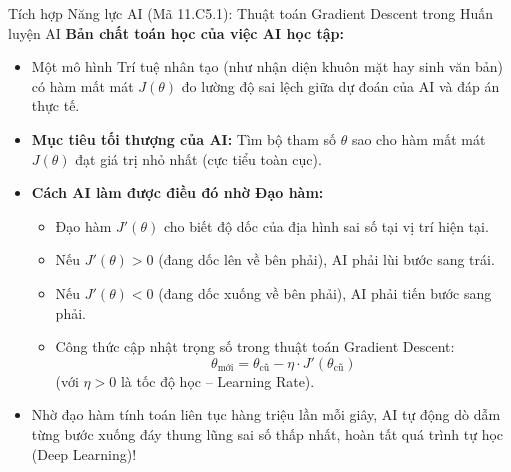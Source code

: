 \documentclass[12pt, a4paper]{article}
\begin{document}
\begin{aibox}{Tích hợp Năng lực AI (Mã 11.C5.1): Thuật toán Gradient Descent trong Huấn luyện AI}
\textbf{Bản chất toán học của việc AI học tập:}
\begin{itemize}[leftmargin=0.5cm]
    \item Một mô hình Trí tuệ nhân tạo (như nhận diện khuôn mặt hay sinh văn bản) có hàm mất mát $J(\theta)$ đo lường độ sai lệch giữa dự đoán của AI và đáp án thực tế.
    \item \textbf{Mục tiêu tối thượng của AI:} Tìm bộ tham số $\theta$ sao cho hàm mất mát $J(\theta)$ đạt giá trị nhỏ nhất (cực tiểu toàn cục).
    \item \textbf{Cách AI làm được điều đó nhờ Đạo hàm:}
    \begin{itemize}[leftmargin=0.4cm]
        \item Đạo hàm $J'(\theta)$ cho biết độ dốc của địa hình sai số tại vị trí hiện tại.
        \item Nếu $J'(\theta) > 0$ (đang dốc lên về bên phải), AI phải lùi bước sang trái.
        \item Nếu $J'(\theta) < 0$ (đang dốc xuống về bên phải), AI phải tiến bước sang phải.
        \item Công thức cập nhật trọng số trong thuật toán Gradient Descent:
        \begin{equation}
            \theta_{\text{mới}} = \theta_{\text{cũ}} - \eta \cdot J'(\theta_{\text{cũ}})
        \end{equation}
        (với $\eta > 0$ là tốc độ học -- Learning Rate).
    \end{itemize}
    \item Nhờ đạo hàm tính toán liên tục hàng triệu lần mỗi giây, AI tự động dò dẫm từng bước xuống đáy thung lũng sai số thấp nhất, hoàn tất quá trình tự học (Deep Learning)!
\end{itemize}
\begin{center}
\end{center}
\end{aibox}
\end{document}
